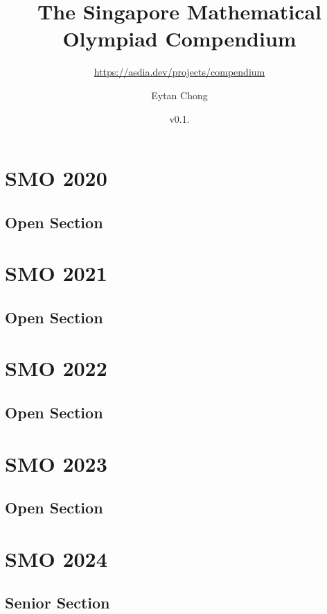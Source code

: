\documentclass[a4paper,listof=totoc,bibliography=totoc,openany]{scrbook}
\title{The Singapore Mathematical Olympiad Compendium}
\subtitle{\url{https://asdia.dev/projects/compendium}}
\author{Eytan Chong}
\date{v0.1.\datetwo}
\begin{document}
\maketitle

\frontmatter

\tableofcontents



\mainmatter


\chapter{SMO 2020}
\section{Open Section}


\chapter{SMO 2021}
\section{Open Section}


\chapter{SMO 2022}
\section{Open Section}



\chapter{SMO 2023}
\section{Open Section}



\chapter{SMO 2024}
\section{Senior Section}

\end{document}

